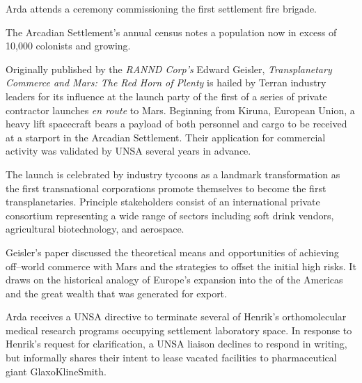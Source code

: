 

Arda attends a ceremony commissioning the first settlement fire brigade.
\StopTimelineDate

The Arcadian Settlement's annual census notes a population now in excess of 10,000 colonists and growing.
\StopTimelineDate

Originally published by the {\it RANND Corp's} Edward Geisler, {\it Transplanetary Commerce and Mars: The Red Horn of Plenty} is hailed by Terran industry leaders for its influence at the launch party of the first of a series of private contractor launches {\it en route} to Mars. Beginning from Kiruna, European Union, a heavy lift spacecraft bears a payload of both personnel and cargo to be received at a starport in the Arcadian Settlement. Their application for commercial activity was validated by UNSA several years in advance.

The launch is celebrated by industry tycoons as a landmark transformation as the first transnational corporations promote themselves to become the first transplanetaries. Principle stakeholders consist of an international private consortium representing a wide range of sectors including soft drink vendors, agricultural biotechnology, and aerospace.

Geisler's paper discussed the theoretical means and opportunities of achieving off--world commerce with Mars and the strategies to offset the initial high risks. It draws on the historical analogy of Europe's expansion into the  of the Americas and the great wealth that was generated for export.
\StopTimelineDate

Arda receives a UNSA directive to terminate several of Henrik's orthomolecular medical research programs occupying settlement laboratory space. In response to Henrik's request for clarification, a UNSA liaison declines to respond in writing, but informally shares their intent to lease vacated facilities to pharmaceutical giant GlaxoKlineSmith.
\StopTimelineDate

